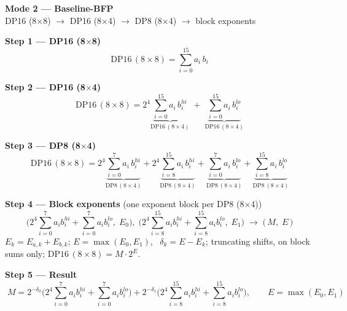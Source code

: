 \documentclass[fleqn]{article}
\newcommand{\DPop}[3]{\mathrm{DP#1}\,(#2\!\times\!#3)}
\begin{document}
\begin{center}
{\LARGE \textbf{Mode 2 --- Baseline-BFP}}\\[4pt]
{\large DP16 (8$\times$8) $\rightarrow$ DP16 (8$\times$4) $\rightarrow$ DP8 (8$\times$4) $\rightarrow$ block exponents}
\end{center}

\vspace{0.5em}

\textbf{Step 1 --- DP16 (8$\times$8)}
\[ \DPop{16}{8}{8} = \sum_{i=0}^{15} a_i \, b_i \]

\vspace{0.5em}

\textbf{Step 2 --- DP16 (8$\times$4)}
\[
\DPop{16}{8}{8}
  = 2^{4} \underbrace{\sum_{i=0}^{15} a_i \, b_i^{hi}}_{\DPop{16}{8}{4}}
  \; + \; \underbrace{\sum_{i=0}^{15} a_i \, b_i^{lo}}_{\DPop{16}{8}{4}}
\]

\vspace{0.5em}

\textbf{Step 3 --- DP8 (8$\times$4)}
\[
\DPop{16}{8}{8}
  = 2^{4} \underbrace{\sum_{i=0}^{7} a_i \, b_i^{hi}}_{\DPop{8}{8}{4}}
  + 2^{4} \underbrace{\sum_{i=8}^{15} a_i \, b_i^{hi}}_{\DPop{8}{8}{4}}
  + \underbrace{\sum_{i=0}^{7} a_i \, b_i^{lo}}_{\DPop{8}{8}{4}}
  + \underbrace{\sum_{i=8}^{15} a_i \, b_i^{lo}}_{\DPop{8}{8}{4}}
\]

\vspace{0.5em}

\textbf{Step 4 --- Block exponents}\quad
{\small(one exponent block per DP8 (8$\times$4))}
\[
\Big(2^{4}\!\sum_{i=0}^{7} a_i b_i^{hi} + \sum_{i=0}^{7} a_i b_i^{lo},\; E_0\Big) ,\;
\Big(2^{4}\!\sum_{i=8}^{15} a_i b_i^{hi} + \sum_{i=8}^{15} a_i b_i^{lo},\; E_1\Big)
\;\longrightarrow\;
\Big(\, M ,\; E \,\Big)
\]
$E_k=E_{a,k}+E_{b,k}$; \quad $E=\max(E_0,E_1)$, \ $\delta_k=E-E_k$; \quad truncating shifts, on block sums only; \quad $\DPop{16}{8}{8}=M\cdot2^{E}$.

\vspace{0.5em}

\textbf{Step 5 --- Result}
\[
\boxed{\;
M = 2^{-\delta_0}\Big(2^{4}\!\sum_{i=0}^{7} a_i b_i^{hi} + \sum_{i=0}^{7} a_i b_i^{lo}\Big)
  + 2^{-\delta_1}\Big(2^{4}\!\sum_{i=8}^{15} a_i b_i^{hi} + \sum_{i=8}^{15} a_i b_i^{lo}\Big),
\qquad E = \max(E_0,E_1)
\;}
\]
\end{document}
